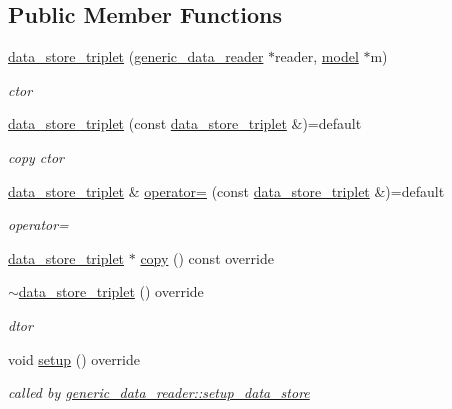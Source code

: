 \subsection*{Public Member Functions}
\begin{DoxyCompactItemize}
\item 
\hyperlink{classlbann_1_1data__store__triplet_ad6ba997401d292ffb9678a75e02a258f}{data\+\_\+store\+\_\+triplet} (\hyperlink{classlbann_1_1generic__data__reader}{generic\+\_\+data\+\_\+reader} $\ast$reader, \hyperlink{classlbann_1_1model}{model} $\ast$m)
\begin{DoxyCompactList}\small\item\em ctor \end{DoxyCompactList}\item 
\hyperlink{classlbann_1_1data__store__triplet_a059777d3131c8f8ecae04a8ac9b17036}{data\+\_\+store\+\_\+triplet} (const \hyperlink{classlbann_1_1data__store__triplet}{data\+\_\+store\+\_\+triplet} \&)=default
\begin{DoxyCompactList}\small\item\em copy ctor \end{DoxyCompactList}\item 
\hyperlink{classlbann_1_1data__store__triplet}{data\+\_\+store\+\_\+triplet} \& \hyperlink{classlbann_1_1data__store__triplet_a0ed814d64a7b664ef9646186c4642098}{operator=} (const \hyperlink{classlbann_1_1data__store__triplet}{data\+\_\+store\+\_\+triplet} \&)=default
\begin{DoxyCompactList}\small\item\em operator= \end{DoxyCompactList}\item 
\hyperlink{classlbann_1_1data__store__triplet}{data\+\_\+store\+\_\+triplet} $\ast$ \hyperlink{classlbann_1_1data__store__triplet_a446ee3b1fa3097e51bd0e198de960cd4}{copy} () const override
\item 
\hyperlink{classlbann_1_1data__store__triplet_a4051f8b3236f06554c2f35e71d3fdf70}{$\sim$data\+\_\+store\+\_\+triplet} () override
\begin{DoxyCompactList}\small\item\em dtor \end{DoxyCompactList}\item 
void \hyperlink{classlbann_1_1data__store__triplet_aca66b9cf71d7ba2b9870e76c5b92b5e8}{setup} () override
\begin{DoxyCompactList}\small\item\em called by \hyperlink{classlbann_1_1generic__data__reader_a8b2a09d38512fc11f1b9d572c89100a7}{generic\+\_\+data\+\_\+reader\+::setup\+\_\+data\+\_\+store} \end{DoxyCompactList}\end{DoxyCompactItemize}
